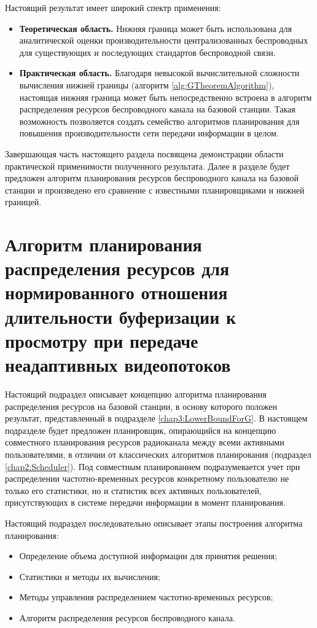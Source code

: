 Настоящий результат имеет широкий спектр применения:
\begin{itemize}
	\item \textbf{Теоретическая область.} Нижняя граница может быть использована для аналитической оценки производительности централизованных беспроводных для существующих и последующих стандартов беспроводной связи.
	\item \textbf{Практическая область.} Благодаря невысокой вычислительной сложности вычисления нижней границы (алгоритм \ref{alg:GTheoremAlgorithm}), настоящая нижняя граница может быть непосредственно встроена в алгоритм распределения ресурсов беспроводного канала на базовой станции. Такая возможность позволяется создать семейство алгоритмов планирования для повышения производительности сети передачи информации в целом.
\end{itemize}

Завершающая часть настоящего раздела посвящена демонстрации области практической применимости полученного результата. Далее в разделе будет предложен алгоритм планирования ресурсов беспроводного канала на базовой станции и произведено его сравнение с известными планировщиками и нижней границей.

\section{Алгоритм планирования распределения ресурсов для нормированного отношения длительности буферизации к просмотру при передаче неадаптивных видеопотоков}
\label{chap3:NonAdaptiveScheduler}

Настоящий подраздел описывает концепцию алгоритма планирования распределения ресурсов на базовой станции, в основу которого положен результат, представленный в подразделе \ref{chap3:LowerBoundForG}. В настоящем подразделе будет предложен планировщик, опирающийся на концепцию совместного планирования ресурсов радиоканала между всеми активными пользователями, в отличии от классических алгоритмов планирования (подраздел \ref{chap2:Scheduler}). Под совместным планированием подразумевается учет при распределении частотно-временных ресурсов конкретному пользователю не только его статистики, но и статистик всех активных пользователей, присутствующих в системе передачи информации в момент планирования.

Настоящий подраздел последовательно описывает этапы построения алгоритма планирования:
\begin{itemize}
	\item Определение объема доступной информации для принятия решения;
	\item Статистики и методы их вычисления;
	\item Методы управления распределением частотно-временных ресурсов;
	\item Алгоритм распределения ресурсов беспроводного канала.
\end{itemize}

